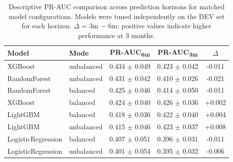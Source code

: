 \begin{table}[ht]
\centering
\caption{Descriptive PR-AUC comparison across prediction horizons for matched model configurations. Models were tuned independently on the DEV set for each horizon. $\Delta$ = 3m $-$ 6m; positive values indicate higher performance at 3 months.}
\label{tab:3m_vs_6m}
\small
\begin{tabular}{llccc}
\toprule
Model & Mode & PR-AUC\textsubscript{6m} & PR-AUC\textsubscript{3m} & $\Delta$ \\
\midrule
XGBoost & unbalanced & 0.434 $\pm$ 0.049 & 0.423 $\pm$ 0.042 & -0.011 \\
RandomForest & unbalanced & 0.431 $\pm$ 0.042 & 0.410 $\pm$ 0.026 & -0.021 \\
RandomForest & balanced & 0.425 $\pm$ 0.046 & 0.414 $\pm$ 0.050 & -0.011 \\
XGBoost & balanced & 0.424 $\pm$ 0.040 & 0.426 $\pm$ 0.036 & +0.002 \\
LightGBM & balanced & 0.418 $\pm$ 0.036 & 0.422 $\pm$ 0.040 & +0.004 \\
LightGBM & unbalanced & 0.415 $\pm$ 0.046 & 0.423 $\pm$ 0.037 & +0.008 \\
LogisticRegression & balanced & 0.407 $\pm$ 0.051 & 0.396 $\pm$ 0.031 & -0.011 \\
LogisticRegression & unbalanced & 0.401 $\pm$ 0.054 & 0.395 $\pm$ 0.032 & -0.006 \\
\bottomrule
\end{tabular}
\end{table}
